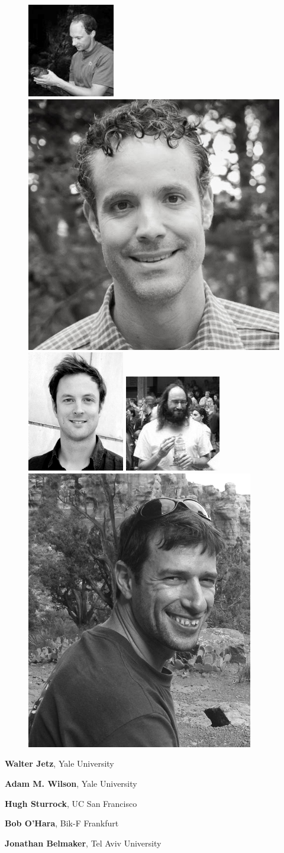 \documentclass[xcolor=x11names, compress]{beamer}
\renewcommand{\(}{\begin{columns}}
\renewcommand{\)}{\end{columns}}
\newcommand{\<}[1]{\begin{column}{#1}}
\renewcommand{\>}{\end{column}}
\begin{document}
\begin{frame}

\begin{figure}
	\includegraphics[height=0.2\linewidth]{fig/walter.png}
	\includegraphics[height=0.2\linewidth]{fig/adam.png}
	\includegraphics[height=0.2\linewidth]{fig/hugh.png}
	\includegraphics[height=0.2\linewidth]{fig/bob.png}
	\includegraphics[height=0.2\linewidth]{fig/jonathan.png}
\end{figure}

\textbf{Walter Jetz}, Yale University 

\textbf{Adam M. Wilson}, Yale University 

\textbf{Hugh Sturrock}, UC San Francisco 

\textbf{Bob O'Hara}, Bik-F Frankfurt 

\textbf{Jonathan Belmaker}, Tel Aviv University


\end{frame}

\end{document}
